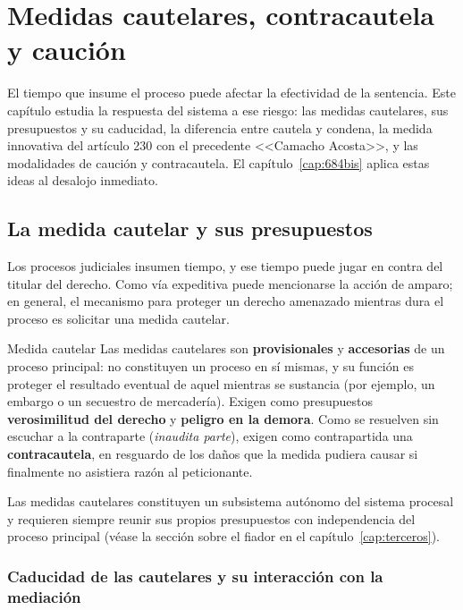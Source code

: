 \documentclass[12pt,oneside]{book}
\begin{document}
\chapter{Medidas cautelares, contracautela y caución}\label{cap:cautelares}

El tiempo que insume el proceso puede afectar la efectividad de la sentencia. Este capítulo estudia la respuesta del sistema a ese riesgo: las medidas cautelares, sus presupuestos y su caducidad, la diferencia entre cautela y condena, la medida innovativa del artículo 230 con el precedente <<Camacho Acosta>>, y las modalidades de caución y contracautela. El capítulo~\ref{cap:684bis} aplica estas ideas al desalojo inmediato.

\section{La medida cautelar y sus presupuestos}

Los procesos judiciales insumen tiempo, y ese tiempo puede jugar en contra del titular del derecho. Como vía expeditiva puede mencionarse la acción de amparo; en general, el mecanismo para proteger un derecho amenazado mientras dura el proceso es solicitar una medida cautelar.

\begin{definition}{Medida cautelar}
Las medidas cautelares son \textbf{provisionales} y \textbf{accesorias} de un proceso principal: no constituyen un proceso en sí mismas, y su función es proteger el resultado eventual de aquel mientras se sustancia (por ejemplo, un embargo o un secuestro de mercadería). Exigen como presupuestos \textbf{verosimilitud del derecho} y \textbf{peligro en la demora}. Como se resuelven sin escuchar a la contraparte (\emph{inaudita parte}), exigen como contrapartida una \textbf{contracautela}, en resguardo de los daños que la medida pudiera causar si finalmente no asistiera razón al peticionante.
\end{definition}

Las medidas cautelares constituyen un subsistema autónomo del sistema procesal y requieren siempre reunir sus propios presupuestos con independencia del proceso principal (véase la sección sobre el fiador en el capítulo~\ref{cap:terceros}).

\subsection{Caducidad de las cautelares y su interacción con la mediación}
\end{document}
